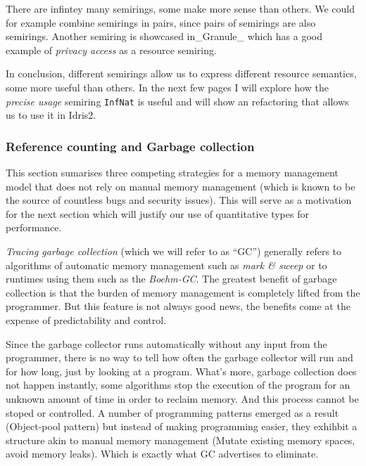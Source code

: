 \documentclass[
]{article}
\begin{document}
There are infintey many semirings, some make more sense than others. We
could for example combine semirings in pairs, since pairs of semirings
are also semirings. Another semiring is showcased
in\_Granule\_\cite{granule} which has a good example of \emph{privacy
access} as a resource semiring.

In conclusion, different semirings allow us to express different
resource semantics, some more useful than others. In the next few pages
I will explore how the \emph{precise usage} semiring \texttt{InfNat} is
useful and will show an refactoring that allows us to use it in Idris2.

\hypertarget{reference-counting-and-garbage-collection}{%
\subsubsection{Reference counting and Garbage
collection}\label{reference-counting-and-garbage-collection}}

This section sumarises three competing strategies for a memory
management model that does not rely on manual memory management (which
is known to be the source of countless bugs and security issues). This
will serve as a motivation for the next section which will justify our
use of quantitative types for performance.

\emph{Tracing garbage collection} (which we will refer to as ``GC'')
generally refers to algorithms of automatic memory management such as
\emph{mark \& sweep} or to runtimes using them such as the
\emph{Boehm-GC}. The greatest benefit of garbage collection is that the
burden of memory management is completely lifted from the programmer.
But this feature is not always good news, the benefits come at the
expense of predictability and control.

Since the garbage collector runs automatically without any input from
the programmer, there is no way to tell how often the garbage collector
will run and for how long, just by looking at a program. What's more,
garbage collection does not happen instantly, some algorithms stop the
execution of the program for an unknown amount of time in order to
reclaim memory. And this process cannot be stoped or controlled. A
number of programming patterns emerged as a result (Object-pool pattern)
but instead of making programming easier, they exhihbit a structure akin
to manual memory management (Mutate existing memory spaces, avoid memory
leaks). Which is exactly what GC advertises to eliminate.
\end{document}
